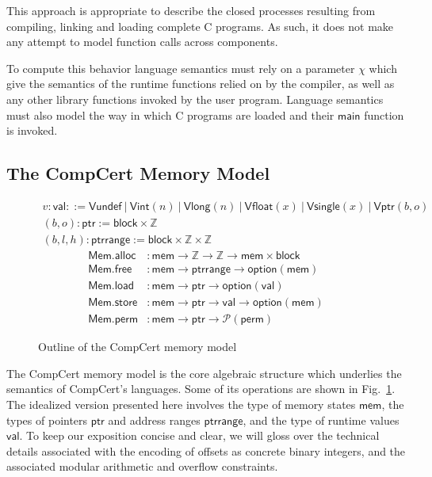 \documentclass[sigplan,10pt,review,anonymous]{acmart}
\newcommand{\kw}[1]{\ensuremath{ \mathsf{#1} }}
\newcommand{\alt}{\ |\ } %
\begin{document}
This approach is appropriate to describe the closed processes
resulting from compiling, linking and loading complete C programs.
As such, it does not make any attempt to model
function calls across components.

To compute this behavior
language semantics must rely on a parameter $\chi$
which give the semantics of the runtime functions
relied on by the compiler,
as well as any other library functions
invoked by the user program.
Language semantics must also model
the way in which C programs are loaded
and their \kw{main} function is invoked.


\cbend

\subsection{The CompCert Memory Model} \label{sec:sem:mm} %

\begin{figure} %
  \footnotesize
  \begin{gather*}
    v : \kw{val} ::=
      \kw{Vundef} \alt
      \kw{Vint}(n) \alt
      \kw{Vlong}(n) \alt
      \kw{Vfloat}(x) \alt
      \kw{Vsingle}(x) \alt
      \kw{Vptr}(b, o)
    \\
    (b, o) : \kw{ptr} :=
      \kw{block} \times \mathbb{Z}
    \\
    (b, l, h) : \kw{ptrrange} :=
      \kw{block} \times \mathbb{Z} \times \mathbb{Z}
  \end{gather*}
  \begin{align*}
    \kw{Mem.alloc} &:
      \kw{mem} \rightarrow \mathbb{Z} \rightarrow \mathbb{Z} \rightarrow
      \kw{mem} \times \kw{block}
    \\
    \kw{Mem.free} &:
      \kw{mem} \rightarrow
      \kw{ptrrange} \rightarrow
      \kw{option}(\kw{mem})
    \\
    \kw{Mem.load} &:
      \kw{mem} \rightarrow \kw{ptr} \rightarrow \kw{option}(\kw{val})
    \\
    \kw{Mem.store} &:
      \kw{mem} \rightarrow \kw{ptr} \rightarrow \kw{val} \rightarrow \kw{option}(\kw{mem})
    \\
    \kw{Mem.perm} &:
      \kw{mem} \rightarrow \kw{ptr} \rightarrow \mathcal{P}(\kw{perm})
  \end{align*}
  \caption{Outline of the CompCert memory model}
  \label{fig:mm}
\end{figure}

The CompCert memory model \cite{compcertmmv2}
is the core algebraic structure
which underlies the semantics of CompCert's languages.
Some of its operations
are shown in Fig.~\ref{fig:mm}.
The idealized version presented here
involves
the type of memory states \kw{mem},
the types of pointers \kw{ptr} and address ranges \kw{ptrrange}, and
the type of runtime values \kw{val}.
To keep our exposition concise and clear,
we will gloss over the technical details
associated with the encoding of offsets
as concrete binary integers,
and the associated modular arithmetic and overflow constraints.
\end{document}
